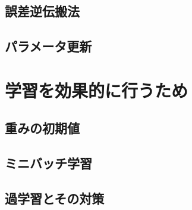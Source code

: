 \subsection{誤差逆伝搬法}

\subsection{パラメータ更新}


\section{学習を効果的に行うため}

\subsection{重みの初期値}

\subsection{ミニバッチ学習}

\subsection{過学習とその対策}　
